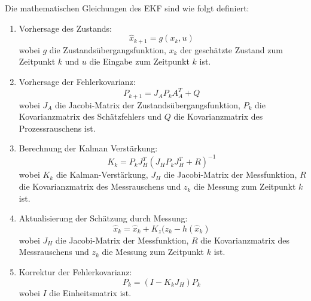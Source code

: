 Die mathematischen Gleichungen des EKF sind wie folgt definiert:
\begin{enumerate}
      \item Vorhersage des Zustands:
            \begin{equation*}
                  \hat{x}_{k+1} = g({x}_{k}, u)\
            \end{equation*}
            wobei $g$ die Zustandsübergangsfunktion,
            $x_{k}$ der geschätzte Zustand zum Zeitpunkt $k$ 
            und $u$ die Eingabe zum Zeitpunkt $k$ ist.\\
      \item Vorhersage der Fehlerkovarianz:
            \begin{equation*}
                  P_{k + 1} = J_{A} P_{k} A_{A}^T + Q\
            \end{equation*}
            wobei $J_{A}$ die Jacobi-Matrix der Zustandsübergangsfunktion,
            $P_{k}$ die Kovarianzmatrix des Schätzfehlers 
            und $Q$ die Kovarianzmatrix des Prozessrauschens ist.\\
      \item Berechnung der Kalman Verstärkung:
            \begin{equation*}
                  K_{k} = P_{k} J_{H}^T (J_{H} P_{k} J_{H}^T + R)^{-1}\
            \end{equation*}
            wobei $K_{k} $ die Kalman-Verstärkung,
            $J_{H}$ die Jacobi-Matrix der Messfunktion,
            $R$ die Kovarianzmatrix des Messrauschens und
            $z_{k}$ die Messung zum Zeitpunkt $k$ ist.\\
      \item Aktualisierung der Schätzung durch Messung:
            \begin{equation*}
                  \hat{x}_{k} = \hat{x}_{k} + K_{z} (z_{k} - h (\hat{x}_{k})\
            \end{equation*}
            wobei $J_{H}$ die Jacobi-Matrix der Messfunktion,
            $R$ die Kovarianzmatrix des Messrauschens
            und $z_{k}$ die Messung zum Zeitpunkt $k$ ist.\\

      \item Korrektur der Fehlerkovarianz:
            \begin{equation*}
                  P_{k} = (I - K_{k} J_{H}) P_{k}\
            \end{equation*}
            wobei $I$ die Einheitsmatrix ist.\\
\end{enumerate}

